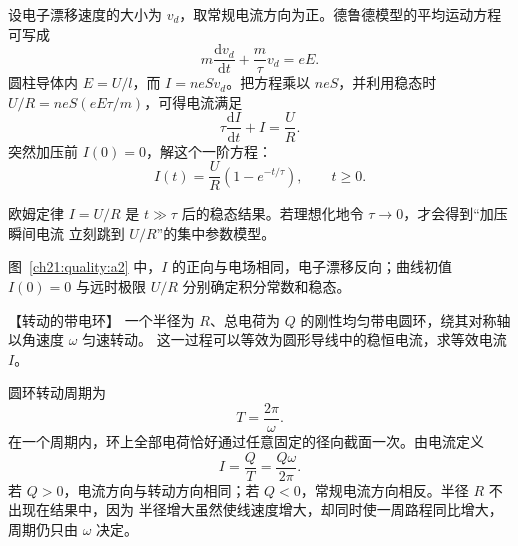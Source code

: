 {\begin{xesolution}
设电子漂移速度的大小为 $v_d$，取常规电流方向为正。德鲁德模型的平均运动方程可写成
\[
  m\frac{\mathrm dv_d}{\mathrm dt}+\frac m\tau v_d=eE.
\]
圆柱导体内 $E=U/l$，而 $I=neSv_d$。把方程乘以 $neS$，并利用稳态时
$U/R=neS(eE\tau/m)$，可得电流满足
\[
  \tau\frac{\mathrm dI}{\mathrm dt}+I=\frac UR.
\]
突然加压前 $I(0)=0$，解这个一阶方程：
\[
  \boxed{I(t)=\frac UR\left(1-e^{-t/\tau}\right),\qquad t\ge0}.
\]

\par\noindent\begin{minipage}{\linewidth}
\transientCurrentFigure
{}
\end{minipage}\par\medskip

欧姆定律 $I=U/R$ 是 $t\gg\tau$ 后的稳态结果。若理想化地令 $\tau\to0$，才会得到“加压瞬间电流
立刻跳到 $U/R$”的集中参数模型。

图~\ref{ch21:quality:a2} 中，$I$ 的正向与电场相同，电子漂移反向；曲线初值 $I(0)=0$ 与远时极限 $U/R$ 分别确定积分常数和稳态。
\end{xesolution}



\begin{origexamplebox}{【转动的带电环】}\label{ch21:ex:s36-5-3}
一个半径为 $R$、总电荷为 $Q$ 的刚性均匀带电圆环，绕其对称轴以角速度 $\omega$ 匀速转动。
这一过程可以等效为圆形导线中的稳恒电流，求等效电流 $I$。
\par\noindent\begin{minipage}{\linewidth}
\emRotatingRingQuestion
{}
\end{minipage}\par\medskip
\end{origexamplebox}
\begin{xesolution}\par\nopagebreak[4]

\par\noindent\begin{minipage}{\linewidth}
\rotatingChargedRingFigure
{}
\end{minipage}\par\medskip


圆环转动周期为
\[
  T=\frac{2\pi}{\omega}.
\]
在一个周期内，环上全部电荷恰好通过任意固定的径向截面一次。由电流定义
\[
  \boxed{I=\frac QT=\frac{Q\omega}{2\pi}}.
\]
若 $Q>0$，电流方向与转动方向相同；若 $Q<0$，常规电流方向相反。半径 $R$ 不出现在结果中，因为
半径增大虽然使线速度增大，却同时使一周路程同比增大，周期仍只由 $\omega$ 决定。


\end{xesolution}}
